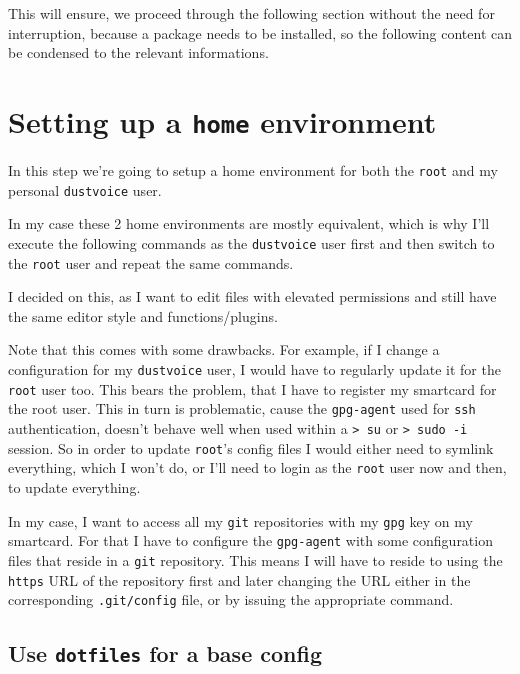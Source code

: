 \documentclass[10pt]{dustdoc}
\begin{document}
This will ensure, we proceed through the following section without the need for interruption, because a package needs to be installed, so the following content can be condensed to the relevant informations.

\section{Setting up a \texttt{home} environment}%
\label{sec:setting-up-a-home-environment}

In this step we’re going to setup a home environment for both the \texttt{root} and my personal \texttt{dustvoice} user.

\begin{NOTE}
    In my case these 2 home environments are mostly equivalent, which is why I’ll execute the following commands as the \texttt{dustvoice} user first and then switch to the \texttt{root} user and repeat the same commands.

    I decided on this, as I want to edit files with elevated permissions and still have the same editor style and functions/plugins.

    Note that this comes with some drawbacks.
    For example, if I change a configuration for my \texttt{dustvoice} user, I would have to regularly update it for the \texttt{root} user too.
    This bears the problem, that I have to register my smartcard for the root user.
    This in turn is problematic, cause the \texttt{gpg-agent} used for \texttt{ssh} authentication, doesn’t behave well when used within a \texttt{> su} or \texttt{> sudo -i} session.
    So in order to update \texttt{root}'s config files I would either need to symlink everything, which I won’t do, or I’ll need to login as the \texttt{root} user now and then, to update everything.
\end{NOTE}

\begin{NOTE}
    In my case, I want to access all my \texttt{git} repositories with my \texttt{gpg} key on my smartcard.
    For that I have to configure the \texttt{gpg-agent} with some configuration files that reside in a \texttt{git} repository.
    This means I will have to reside to using the \texttt{https} URL of the repository first and later changing the URL either in the corresponding \texttt{.git/config} file, or by issuing the appropriate command.
\end{NOTE}

\subsection{Use \texttt{dotfiles} for a base config}%
\label{sec:use-dotfiles-for-a-base-config}
\end{document}
